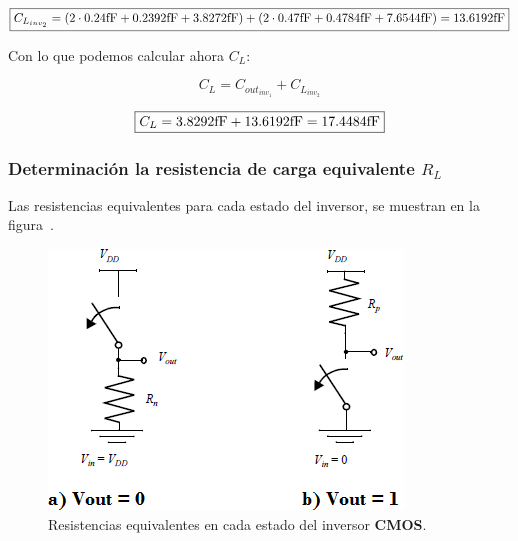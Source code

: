 \begin{equation*}
\boxed{ C_{L_{inv_{2}}} =  \left( 2 \cdot 0.24 \si[per-mode=symbol]{\femto\farad} + 0.2392 \si[per-mode=symbol]{\femto\farad} + 3.8272 \si[per-mode=symbol]{\femto\farad} \right) + \left( 2 \cdot 0.47 \si[per-mode=symbol]{\femto\farad} + 0.4784 \si[per-mode=symbol]{\femto\farad} + 7.6544 \si[per-mode=symbol]{\femto\farad} \right) = 13.6192 \si[per-mode=symbol]{\femto\farad} }
\end{equation*}



Con lo que podemos calcular ahora $C_{L}$:


\begin{equation*}
C_{L} = C_{out_{inv_{1}}} + C_{L_{inv_{2}}}
\end{equation*}


\begin{equation*}
\boxed{  C_{L} = 3.8292 \si[per-mode=symbol]{\femto\farad} + 13.6192 \si[per-mode=symbol]{\femto\farad} = 17.4484 \si[per-mode=symbol]{\femto\farad} }
\end{equation*}





\subsubsection{Determinación la resistencia de carga equivalente $R_{L}$}


Las resistencias equivalentes para cada estado del inversor, se muestran en la figura~.




\begin{figure}[H] %
\begin{center}
\includegraphics[width=0.7 \textwidth, angle=0]{./img/point1/resistance_equivalent}
\caption{\label{fig:fig_inverter_equivalent_resistances}\footnotesize{Resistencias equivalentes en cada estado del inversor \textbf{CMOS}.}}
\end{center}
\end{figure}



